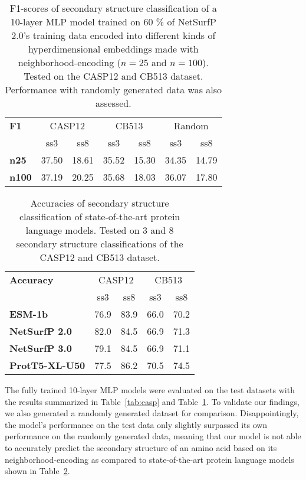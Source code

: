 \begin{table}[h]
    \caption{F1-scores of secondary structure classification of a 10-layer MLP model trained on 60 \% of NetSurfP 2.0's training data encoded into different kinds of hyperdimensional embeddings made with neighborhood-encoding ($n = 25$ and $n=100$). Tested on the CASP12 and CB513 dataset. Performance with randomly generated data was also assessed.}
    \label{tab:casp2}
    \centering
    \begin{tabular}{l|cc|cc|cc}
        \toprule
        \textbf{F1} & \multicolumn{2}{c|}{CASP12} & \multicolumn{2}{c|}{CB513} & \multicolumn{2}{c}{Random}\\
        & ss3 & ss8 & ss3 & ss8 & ss3 & ss8 \\
        \midrule
        \textbf{n25} & 37.50 & 18.61 & 35.52 & 15.30 & 34.35 & 14.79\\
        \textbf{n100} & 37.19 & 20.25 & 35.68 & 18.03 & 36.07 & 17.80\\
        \bottomrule
    \end{tabular}
\end{table}

\begin{table}[h]
    \caption{Accuracies of secondary structure classification of state-of-the-art protein language models. Tested on 3 and 8 secondary structure classifications of the CASP12 and CB513 dataset.}
    \label{tab:casp3}
    \centering
    \begin{tabular}{lcc|cc}
        \toprule
        \textbf{Accuracy} & \multicolumn{2}{c|}{CASP12} & \multicolumn{2}{c|}{CB513}\\
        & ss3 & ss8 & ss3 & ss8\\
        \midrule
        \textbf{ESM-1b} & 76.9 & 83.9 & 66.0 & 70.2\\
        \textbf{NetSurfP 2.0} & 82.0 & 84.5 & 66.9 & 71.3\\
        \textbf{NetSurfP 3.0} & 79.1 & 84.5 & 66.9 & 71.1\\
        \textbf{ProtT5-XL-U50} & 77.5 & 86.2 & 70.5 & 74.5\\
        \bottomrule
    \end{tabular}
  \end{table}

The fully trained 10-layer MLP models were evaluated on the test datasets with the results summarized in Table~\ref{tab:casp} and Table~\ref{tab:casp2}. To validate our findings, we also generated a randomly generated dataset for comparison. Disappointingly, the model's performance on the test data only slightly surpassed its own performance on the randomly generated data, meaning that our model is not able to accurately predict the secondary structure of an amino acid based on its neighborhood-encoding as compared to state-of-the-art protein language models shown in Table~\ref{tab:casp3}.


